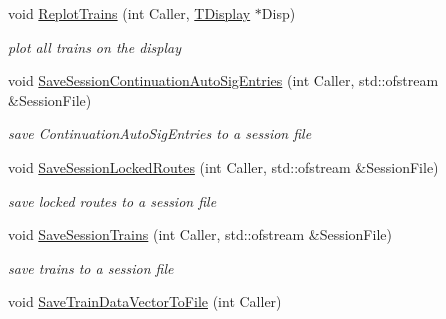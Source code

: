 \begin{DoxyCompactItemize}
\mbox{\label{class_t_train_controller_a47676de8fc677dbcabf565569cb1435c}} 
void \mbox{\hyperlink{class_t_train_controller_a47676de8fc677dbcabf565569cb1435c}{Replot\+Trains}} (int Caller, \mbox{\hyperlink{class_t_display}{T\+Display}} $\ast$Disp)
\begin{DoxyCompactList}\small\item\em plot all trains on the display \end{DoxyCompactList}\item 
\mbox{\label{class_t_train_controller_ab81acdc0c0ab6e1e321f64170f0f71af}} 
void \mbox{\hyperlink{class_t_train_controller_ab81acdc0c0ab6e1e321f64170f0f71af}{Save\+Session\+Continuation\+Auto\+Sig\+Entries}} (int Caller, std\+::ofstream \&Session\+File)
\begin{DoxyCompactList}\small\item\em save Continuation\+Auto\+Sig\+Entries to a session file \end{DoxyCompactList}\item 
\mbox{\label{class_t_train_controller_a57a934999d63367128ca639b9ab3e3ce}} 
void \mbox{\hyperlink{class_t_train_controller_a57a934999d63367128ca639b9ab3e3ce}{Save\+Session\+Locked\+Routes}} (int Caller, std\+::ofstream \&Session\+File)
\begin{DoxyCompactList}\small\item\em save locked routes to a session file \end{DoxyCompactList}\item 
\mbox{\label{class_t_train_controller_afa594bfc6b628d21d02a31c3a13c3a0a}} 
void \mbox{\hyperlink{class_t_train_controller_afa594bfc6b628d21d02a31c3a13c3a0a}{Save\+Session\+Trains}} (int Caller, std\+::ofstream \&Session\+File)
\begin{DoxyCompactList}\small\item\em save trains to a session file \end{DoxyCompactList}\item 
void \mbox{\hyperlink{class_t_train_controller_a6161618bda2a677f797eda9a9deeb9fa}{Save\+Train\+Data\+Vector\+To\+File}} (int Caller)
\item 
\mbox{\label{class_t_train_controller_a8df4599a1ae95093241fb707711af894}} 

\end{DoxyCompactItemize}
